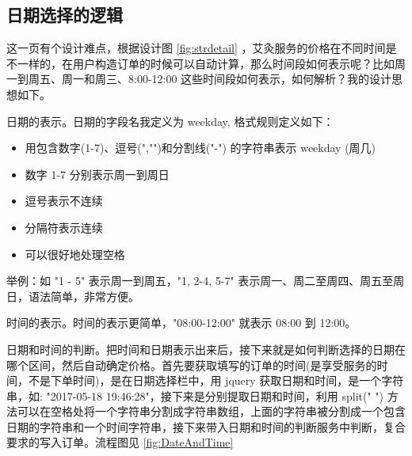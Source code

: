     \subsection{日期选择的逻辑}
      \label{subsec:日期选择的逻辑}
        这一页有个设计难点，根据设计图 \ref{fig:strdetail} ，艾灸服务的价格在不同时间是不一样的，在用户构造订单的时候可以自动计算，那么时间段如何表示呢？比如周一到周五、周一和周三、8:00-12:00 这些时间段如何表示，如何解析？我的设计思想如下。
        \par
        日期的表示。日期的字段名我定义为 weekday, 格式规则定义如下：
        \par
        \begin{itemize}
          \item 用包含数字(1-7)、逗号(","")和分割线("-") 的字符串表示 weekday (周几)
          \item 数字 1-7 分别表示周一到周日
          \item 逗号表示不连续
          \item 分隔符表示连续
          \item 可以很好地处理空格
        \end{itemize}
        举例：如 "1 - 5" 表示周一到周五，"1, 2-4, 5-7" 表示周一、周二至周四、周五至周日，语法简单，非常方便。
        \par
        时间的表示。时间的表示更简单，"08:00-12:00" 就表示 08:00 到 12:00。
        \par
        日期和时间的判断。把时间和日期表示出来后，接下来就是如何判断选择的日期在哪个区间，然后自动确定价格。首先要获取填写的订单的时间(是享受服务的时间，不是下单时间)，是在日期选择栏中，用 jquery 获取日期和时间，是一个字符串，如: "2017-05-18 19:46:28"，接下来是分别提取日期和时间，利用 split(" ") 方法可以在空格处将一个字符串分割成字符串数组，上面的字符串被分割成一个包含日期的字符串和一个时间字符串，接下来带入日期和时间的判断服务中判断，复合要求的写入订单。流程图见 \ref{fig:DateAndTime}
